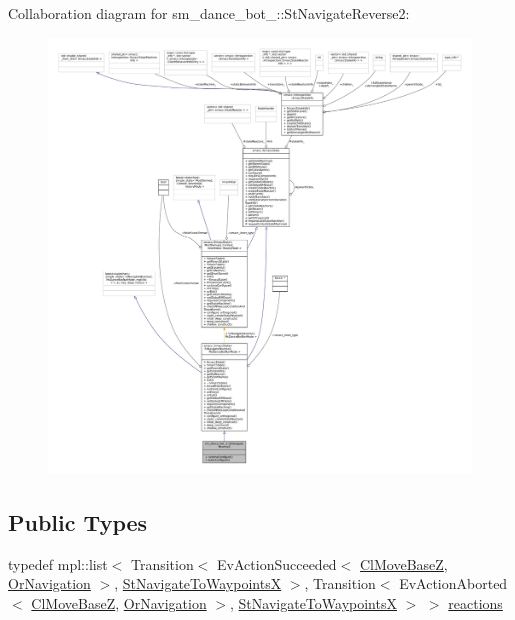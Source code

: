 Collaboration diagram for sm\+\_\+dance\+\_\+bot\+\_\+:\+:St\+Navigate\+Reverse2\+:
\nopagebreak
\begin{figure}[H]
\begin{center}
\leavevmode
\includegraphics[width=350pt]{structsm__dance__bot__3_1_1StNavigateReverse2__coll__graph}
\end{center}
\end{figure}
\subsection*{Public Types}
\begin{DoxyCompactItemize}
\item 
typedef mpl\+::list$<$ Transition$<$ Ev\+Action\+Succeeded$<$ \hyperlink{classmove__base__z__client_1_1ClMoveBaseZ}{Cl\+Move\+BaseZ}, \hyperlink{classsm__dance__bot__3_1_1OrNavigation}{Or\+Navigation} $>$, \hyperlink{structsm__dance__bot__3_1_1StNavigateToWaypointsX}{St\+Navigate\+To\+WaypointsX} $>$, Transition$<$ Ev\+Action\+Aborted$<$ \hyperlink{classmove__base__z__client_1_1ClMoveBaseZ}{Cl\+Move\+BaseZ}, \hyperlink{classsm__dance__bot__3_1_1OrNavigation}{Or\+Navigation} $>$, \hyperlink{structsm__dance__bot__3_1_1StNavigateToWaypointsX}{St\+Navigate\+To\+WaypointsX} $>$ $>$ \hyperlink{structsm__dance__bot__3_1_1StNavigateReverse2_af67c193b37854515a77146f8ec58ed8c}{reactions}
\end{DoxyCompactItemize}
